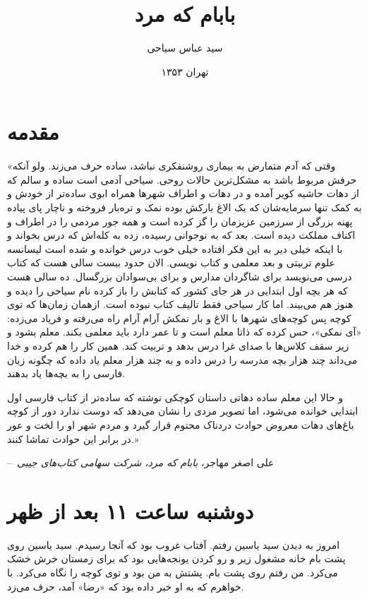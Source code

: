 \documentclass[12pt,a4paper]{book}
\makeatletter
\newenvironment{chapquote}[2][2em]
  {\setlength{\@tempdima}{#1}%
   \def\chapquote@author{#2}%
   \parshape 1 \@tempdima \dimexpr\textwidth-2\@tempdima\relax%
   \itshape}
  {\par\normalfont\hfill--\ \chapquote@author\hspace*{\@tempdima}\par\bigskip}
\makeatother
\begin{document}
\title{بابام که مرد} 
\author{سید عباس سیاحی}
\date{تهران ۱۳۵۳}

\maketitle

\chapter*{مقدمه} 
\begin{chapquote}{علی اصغر مهاجر، \textit{بابام که مرد، شرکت سهامی کتاب‌های جیبی}}


«وقتی که آدم متمارض به بیماری روشنفکری نباشد، ساده حرف می‌زند. ولو آنکه حرفش مربوط باشد به مشکل‌ترین حالات روحی. سیاحی آدمی است ساده و سالم که از دهات حاشیه کویر آمده و در دهات و اطراف شهرها همراه ابوی ساده‌تر از خودش و به کمک تنها سرمایه‌شان که یک الاغ بارکش بوده نمک و تره‌بار فروخته و ناچار پای پیاده پهنه بزرگی از سرزمین عزیزمان را گز کرده است و همه جور مردمی را در اطراف و اکناف مملکت دیده است. بعد که به نوجوانی رسیده، زده به کله‌اش که درس بخواند و با اینکه خیلی دیر به این فکر افتاده خیلی خوب درس خوانده و شده است لیسانسه علوم تربیتی و بعد معلمی و کتاب نویسی. الان حدود بیست سالی هست که کتاب درسی می‌نویسد   برای شاگردان مدارس و برای بی‌سوادان بزرگسال. ده سالی هست که هر بچه اول ابتدایی در هر جای کشور که کتابش را باز کرده نام سیاحی را دیده و هنوز هم می‌بیند. اما کار سیاحی فقط تالیف کتاب نبوده است. ازهمان زمان‌ها که توی کوچه پس کوچه‌های شهرها با الاغ و بار نمکش آرام آرام راه می‌رفته و فریاد می‌زده: «آی نمکی»، حس کرده که ذاتا معلم است و تا عمر دارد باید معلمی بکند. معلم بشود و زیر سقف کلاس‌ها با صدای غرا درس بدهد و تربیت کند. همین کار را هم کرده و خدا می‌داند چند هزار بچه مدرسه را درس داده و به چند هزار معلم یاد داده که چگونه زبان فارسی را به بچه‌ها یاد بدهند.

و حالا این معلم ساده دهاتی داستان کوچکی نوشته که ساده‌تر از کتاب فارسی اول ابتدایی خوانده می‌شود، اما تصویر مردی را نشان می‌دهد که دوست ندارد دور از کوچه باغ‌های دهات معروض حوادث دردناک محتوم قرار گیرد و مردم شهر او را لخت و عور در برابر این حوادث تماشا کنند.»
\end{chapquote}

\tableofcontents

\chapter{دوشنبه ساعت ۱۱ بعد از ظهر}
امروز به دیدن سید یاسین رفتم. آفتاب غروب بود که آنجا رسیدم. سید یاسین روی پشت بام خانه مشغول زیر و رو کردن یونجه‌هایی بود که برای زمستان خرش خشک می‌کرد. من رفتم روی پشت بام. پشتش به من بود و توی کوچه را نگاه می‌کرد. با خواهرم که به او خبر داده بود که «رضا» آمد، حرف می‌زد.
\end{document}
